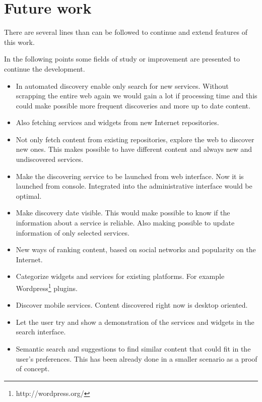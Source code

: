 \section{Future work}

There are several lines than can be followed to continue and extend features of this work.

In the following points some fields of study or improvement are presented to continue the development.

\begin{itemize}
	\item In automated discovery enable only search for new services. Without scrapping the entire web again we would gain a lot if processing time and this could make possible more frequent discoveries and more up to date content.
	\item Also fetching services and widgets from new Internet repositories.
	\item Not only fetch content from existing repositories, explore the web to discover new ones. This makes possible to have different content and always new and undiscovered services.
	\item Make the discovering service to be launched from web interface. Now it is launched from console. Integrated into the administrative interface would be optimal.
	\item Make discovery date visible. This would make possible to know if the information about a service is reliable. Also making possible to update information of only selected services.
	\item New ways of ranking content, based on social networks and popularity on the Internet.
	\item Categorize widgets and services for existing platforms. For example Wordpress\footnote{http://wordpress.org/} plugins.
	\item Discover mobile services. Content discovered right now is desktop oriented.
	\item Let the user try and show a demonstration of the services and widgets in the search interface.
	\item Semantic search and suggestions to find similar content that could fit in the user's preferences. This has been already done in a smaller scenario as a proof of concept.

\end{itemize}